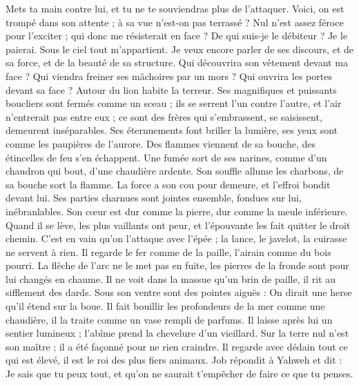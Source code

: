 \begin{multicols}{2}
{Mets ta main contre lui, et tu ne te souviendras plus de l'attaquer.
Voici, on est trompé dans son attente ; à sa vue n'est-on pas terrassé ?
\VerseOne{}Nul n'est assez féroce pour l'exciter ; qui donc me résisterait en face ?
De qui suis-je le débiteur ? Je le paierai. Sous le ciel tout m'appartient.
Je veux encore parler de ses discours, et de sa force, et de la beauté de sa structure.
Qui découvrira son vêtement devant ma face ? Qui viendra freiner ses mâchoires par un mors ?
Qui ouvrira les portes devant sa face ? Autour du lion habite la terreur.
Ses magnifiques et puissants boucliers sont fermés comme un sceau ;
ils se serrent l'un contre l'autre, et l'air n'entrerait pas entre eux ;
ce sont des frères qui s'embrassent, se saisissent, demeurent inséparables.
Ses éternuements font briller la lumière, ses yeux sont comme les paupières de l'aurore.
Des flammes viennent de sa bouche, des étincelles de feu s'en échappent.
Une fumée sort de ses narines, comme d'un chaudron qui bout, d'une chaudière ardente.
Son souffle allume les charbons, de sa bouche sort la flamme.
La force a son cou pour demeure, et l'effroi bondit devant lui.
Ses parties charnues sont jointes ensemble, fondues sur lui, inébranlables.
Son cœur est dur comme la pierre, dur comme la meule inférieure.
Quand il se lève, les plus vaillants ont peur, et l'épouvante les fait quitter le droit chemin.
C'est en vain qu'on l'attaque avec l'épée ; la lance, le javelot, la cuirasse ne servent à rien.
Il regarde le fer comme de la paille, l'airain comme du bois pourri.
La flèche de l'arc ne le met pas en fuite, les pierres de la fronde sont pour lui changés en chaume.
Il ne voit dans la massue qu'un brin de paille, il rit au sifflement des dards.
Sous son ventre sont des pointes aiguës : On dirait une herse qu'il étend sur la boue.
Il fait bouillir les profondeurs de la mer comme une chaudière, il la traite comme un vase rempli de parfums.
Il laisse après lui un sentier lumineux ; l'abîme prend la chevelure d'un vieillard.
Sur la terre nul n'est son maître ; il a été façonné pour ne rien craindre.
Il regarde avec dédain tout ce qui est élevé, il est le roi des plus fiers animaux.
\VerseOne{}Job répondit à Yahweh et dit :
Je sais que tu peux tout, et qu'on ne saurait t'empêcher de faire ce que tu penses.
}
\end{multicols}
